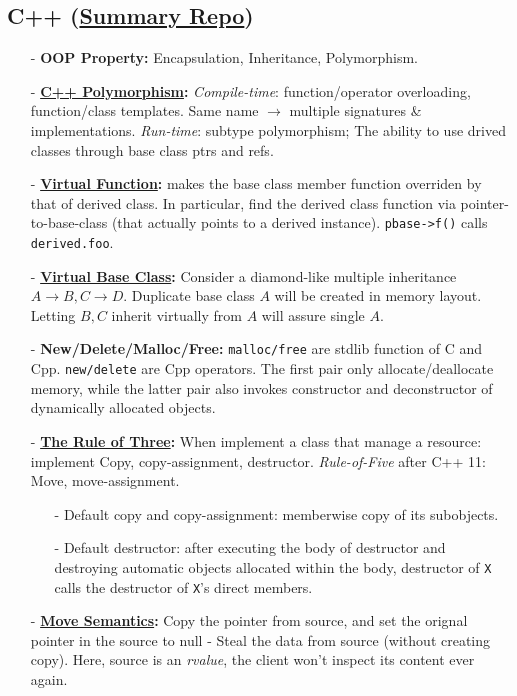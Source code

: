 \documentclass[9pt, landscape]{article}
\begin{document}
\begin{multicols*}{3}
\section{C++ (\href{https://github.com/huihut/interview}{Summary Repo})}
\begin{itemize}
	\item[-] \textbf{OOP Property:} Encapsulation, Inheritance, Polymorphism.
	\item[-] \textbf{\href{https://catonmat.net/cpp-polymorphism}{C++ Polymorphism}:} \textit{Compile-time}: function/operator overloading, function/class templates. Same name $\rightarrow$ multiple signatures \& implementations. \textit{Run-time}: subtype polymorphism; The ability to use drived classes through base class ptrs and refs.
	\item[-] \textbf{\href{https://catonmat.net/cpp-polymorphism}{Virtual Function}:} makes the base class member function overriden by that of derived class. In particular, find the derived class function via pointer-to-base-class (that actually points to a derived instance). \texttt{pbase->f()} calls \texttt{derived.foo}.
	\item[-] \textbf{\href{https://stackoverflow.com/questions/21558/in-c-what-is-a-virtual-base-class}{Virtual Base Class}:} Consider a diamond-like multiple inheritance $A\to B,C \to D$. Duplicate base class $A$ will be created in memory layout. Letting $B,C$ inherit virtually from $A$ will assure single $A$.
	\item[-] \textbf{New/Delete/Malloc/Free:} \texttt{malloc/free} are stdlib function of C and Cpp. \texttt{new/delete} are Cpp operators. The first pair only allocate/deallocate memory, while the latter pair also invokes constructor and deconstructor of dynamically allocated objects.
	\item[-] \textbf{\href{https://stackoverflow.com/questions/4172722/what-is-the-rule-of-three/4172724\#4172724}{The Rule of Three}:} When implement a class that manage a resource: implement Copy, copy-assignment, destructor. \textit{Rule-of-Five} after C++ 11: Move, move-assignment.
	\begin{itemize}[leftmargin=10pt,noitemsep,topsep=0pt,partopsep=0pt]
		\item[-] Default copy and copy-assignment: memberwise copy of its subobjects.
		\item[-] Default destructor: after executing the body of destructor and destroying automatic objects allocated within the body, destructor of \texttt{X} calls the destructor of \texttt{X}'s direct members.
	\end{itemize} 
	\item[-] \textbf{\href{https://stackoverflow.com/questions/3106110/what-is-move-semantics}{Move Semantics}:} Copy the pointer from source, and set the orignal pointer in the source to null - Steal the data from source (without creating copy). Here, source is an \textit{rvalue}, the client won't inspect its content ever again.
\end{itemize}

\end{multicols*}
\end{document}
